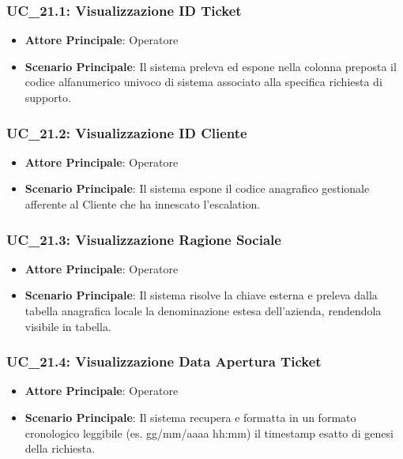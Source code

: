 \subsubsection{UC\_21.1: Visualizzazione ID Ticket}
\label{uc_21.1}
\begin{itemize}
    \item \textbf{Attore Principale}: Operatore
    \item \textbf{Scenario Principale}: Il sistema preleva ed espone nella colonna preposta il codice alfanumerico univoco di sistema associato alla specifica richiesta di supporto.
\end{itemize}

\subsubsection{UC\_21.2: Visualizzazione ID Cliente}
\label{uc_21.2}
\begin{itemize}
    \item \textbf{Attore Principale}: Operatore
    \item \textbf{Scenario Principale}: Il sistema espone il codice anagrafico gestionale afferente al Cliente che ha innescato l'escalation.
\end{itemize}

\subsubsection{UC\_21.3: Visualizzazione Ragione Sociale}
\label{uc_21.3}
\begin{itemize}
    \item \textbf{Attore Principale}: Operatore
    \item \textbf{Scenario Principale}: Il sistema risolve la chiave esterna e preleva dalla tabella anagrafica locale la denominazione estesa dell'azienda, rendendola visibile in tabella.
\end{itemize}

\subsubsection{UC\_21.4: Visualizzazione Data Apertura Ticket}
\label{uc_21.4}
\begin{itemize}
    \item \textbf{Attore Principale}: Operatore
    \item \textbf{Scenario Principale}: Il sistema recupera e formatta in un formato cronologico leggibile (es. gg/mm/aaaa hh:mm) il timestamp esatto di genesi della richiesta.
\end{itemize}

